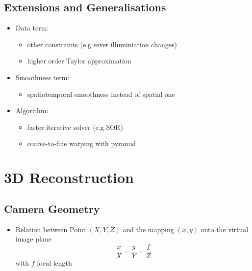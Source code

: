 \documentclass[11pt]{article}
\begin{document}
\subsection{Extensions and Generalisations}
\label{sec-5-3}
\begin{itemize}
\item Data term:
\begin{itemize}
\item other constraints (e.g sever illuminiation changes)
\item higher order Taylor approximation
\end{itemize}
\item Smoothness term:
\begin{itemize}
\item spatiotemporal smoothness instead of spatial one
\end{itemize}
\item Algorithm:
\begin{itemize}
\item faster iterative solver (e.g SOR)
\item coarse-to-fine warping with pyramid
\end{itemize}
\end{itemize}

\section{3D Reconstruction}
\label{sec-6}
\subsection{Camera Geometry}
\label{sec-6-1}
\begin{itemize}
\item Relation between Point $(X,Y,Z)$ and the mapping $(x,y)$ onto the virtual image plane
\[ \frac{x}{X} = \frac{y}{Y} = \frac{f}{Z} \]
with $f$ focal length
\end{itemize}
\end{document}
